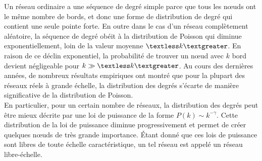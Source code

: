 Un réseau ordinaire a une séquence de degré simple parce que tous les nœuds ont le même nombre de bords, et donc une forme de distribution de degré qui contient une seule pointe forte. En outre dans le cas d'un réseau complètement aléatoire, 
la séquence de degré obéit à la distribution de Poisson qui diminue exponentiellement, loin de la valeur moyenne $\textless k\textgreater$. En raison de ce déclin exponentiel, la probabilité de trouver un nœud avec $k$ bord devient négligeable pour  $k\gg \textless k\textgreater$.
Au cours des dernières années, de nombreux résultats empiriques ont montré que pour la plupart des réseaux réels à grande échelle, la distribution des degrés s'écarte de manière significative de la distribution de Poisson.\\
En particulier, pour un certain nombre de réseaux, la distribution des degrés peut être mieux décrite par une loi de puissance de la forme $P(k)\sim k^{-\gamma}$. Cette distribution de la loi de puissance diminue progressivement et permet de créer quelques nœuds de très grande importance. Étant donné que ces lois de puissance sont libres de toute échelle caractéristique, un tel réseau est appelé un réseau libre-échelle.

